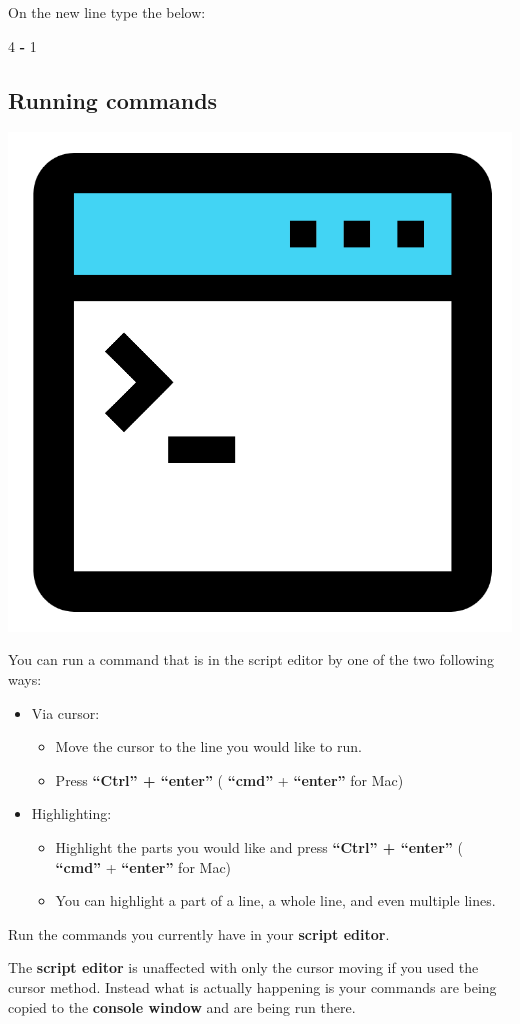 \documentclass[]{book}
\newenvironment{Shaded}{\begin{snugshade}}{\end{snugshade}}
\newcommand{\DecValTok}[1]{\textcolor[rgb]{0.00,0.00,0.81}{#1}}
\newcommand{\StringTok}[1]{\textcolor[rgb]{0.31,0.60,0.02}{#1}}
\newcommand{\OperatorTok}[1]{\textcolor[rgb]{0.81,0.36,0.00}{\textbf{#1}}}
\providecommand{\tightlist}{%
  \setlength{\itemsep}{0pt}\setlength{\parskip}{0pt}}
\begin{document}
On the new line type the below:

\begin{Shaded}
\begin{Highlighting}[]
\DecValTok{4} \OperatorTok{-}\StringTok{ }\DecValTok{1}
\end{Highlighting}
\end{Shaded}

\subsection{Running commands}\label{running-commands}

\begin{center}\includegraphics[width=0.2\linewidth]{figures/command} \end{center}

You can run a command that is in the script editor by one of the two
following ways:

\begin{itemize}
\tightlist
\item
  Via cursor:

  \begin{itemize}
  \tightlist
  \item
    Move the cursor to the line you would like to run.
  \item
    Press \textbf{``Ctrl'' + ``enter''} ( \textbf{``cmd''} +
    \textbf{``enter''} for Mac)
  \end{itemize}
\item
  Highlighting:

  \begin{itemize}
  \tightlist
  \item
    Highlight the parts you would like and press \textbf{``Ctrl'' +
    ``enter''} ( \textbf{``cmd''} + \textbf{``enter''} for Mac)
  \item
    You can highlight a part of a line, a whole line, and even multiple
    lines.
  \end{itemize}
\end{itemize}

Run the commands you currently have in your \textbf{script editor}.

The \textbf{script editor} is unaffected with only the cursor moving if
you used the cursor method. Instead what is actually happening is your
commands are being copied to the \textbf{console window} and are being
run there.
\end{document}
